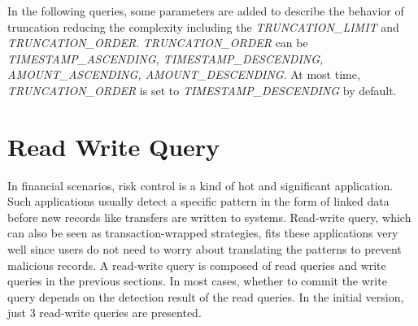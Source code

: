 In the following queries, some parameters are added to describe the behavior of truncation reducing the complexity
including the \emph{TRUNCATION\_LIMIT} and \emph{TRUNCATION\_ORDER}. \emph{TRUNCATION\_ORDER} can be
\emph{TIMESTAMP\_ASCENDING, TIMESTAMP\_DESCENDING, AMOUNT\_ASCENDING, AMOUNT\_DESCENDING}. At most time,
\emph{TRUNCATION\_ORDER} is set to \emph{TIMESTAMP\_DESCENDING} by default.


\section{Read Write Query}
\label{sec:read-write-query}

In financial scenarios, risk control is a kind of hot and significant application.
Such applications usually detect a specific pattern in the form of linked data before
new records like transfers are written to systems. Read-write query, which can also
be seen as transaction-wrapped strategies, fits these applications very well since
users do not need to worry about translating the patterns to prevent malicious records.
A read-write query is composed of read queries and write queries in the previous sections.
In most cases, whether to commit the write query depends on the detection result of the
read queries. In the initial version, just 3 read-write queries are presented.